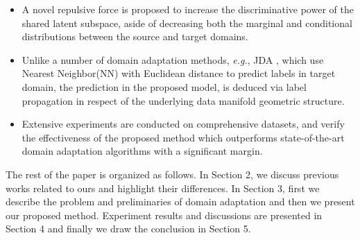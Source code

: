 \documentclass[10pt,twocolumn,letterpaper]{article}
\newcommand\luo[1]{{\footnotesize \color{blue}[#1 - \textbf{Luo}]}}
\begin{document}
\begin{CJK*}{UTF8}{gkai}
\begin{itemize}
	\item A novel repulsive force is proposed to increase the discriminative power of the shared latent subspace, aside of decreasing both the marginal and conditional distributions between the source and target domains. 
    
	\item Unlike a number of domain adaptation methods, \textit{e.g.}, JDA \cite{long2013transfer}, which use Nearest Neighbor(NN) with Euclidean distance to predict labels in target domain,  the prediction in the proposed model, is deduced via label propagation in respect of the underlying data manifold geometric structure. 
% 
% 
    
	\item Extensive experiments are conducted on comprehensive datasets, and verify the effectiveness of the proposed method which outperforms  state-of-the-art domain adaptation algorithms with a significant margin.  
\end{itemize}

    
    

The rest of the paper is organized as follows. In Section 2, we discuss previous works related to ours and highlight their differences. In Section 3, first we describe the problem and preliminaries of domain adaptation and then we present our proposed method. Experiment results and discussions are presented in Section 4 and finally we draw the conclusion in Section 5.  



\end{CJK*}
\end{document}
